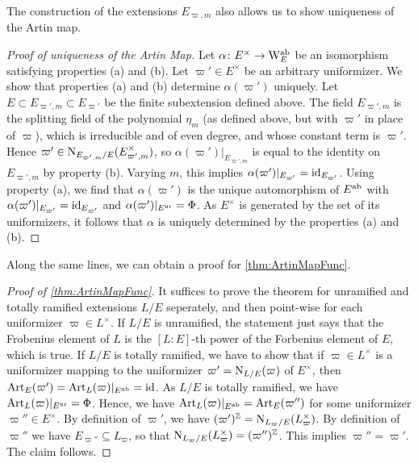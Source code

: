 \documentclass[../main.tex]{subfiles}
\begin{document}
The construction of the extensions $E_{\varpi, m}$ also allows us to show uniqueness 
of the Artin map.

\begin{proof}[Proof of uniqueness of the Artin Map]
  Let $\alpha\colon E^\times \to \mathrm W_E^{\mathrm{ab}}$ be
  an isomorphism satisfying properties (a) and (b). Let ${\varpi'} \in E^\times$
  be an arbitrary
  uniformizer. We show that properties (a) and (b) determine $\alpha({\varpi'})$ uniquely.
  Let $E \subset E_{{\varpi'}, m} \subset E_{\varpi'}$ be the finite subextension 
  defined above. The field $E_{{\varpi'}, m}$ is the splitting field of the polynomial
  $\eta_m$ (as defined above, but with $\varpi'$ in place of $\varpi$), which
  is irreducible and of even degree, and whose
  constant term is ${\varpi'}$. Hence ${\varpi'} \in
  \operatorname{N}_{E_{{\varpi'}, m}/E}(E_{{\varpi'}, m}^\times)$, so $\alpha({\varpi'})|_{E_{{\varpi'}, m}}$ is
  equal to the identity on $E_{{\varpi'}, m}$
  by property (b). Varying $m$, this implies $\alpha({\varpi'})|_{E_{\varpi'}} =
  \operatorname{id}_{E_{\varpi'}}$. Using property (a), we find that $\alpha({\varpi'})$ is the unique
  automorphism of $E^{\mathrm{ab}}$ with $\alpha({\varpi'})|_{E_{\varpi'}} = \operatorname{id}_{E_{\varpi'}}$ and
  $\alpha({\varpi'})|_{E^{\mathrm{nr}}} = \Phi$. As $E^\times$ is generated by the set of its
  uniformizers, it follows that $\alpha$ is uniquely determined by the
  properties (a) and (b).
\end{proof}

Along the same lines, we can obtain a proof for \cref{thm:ArtinMapFunc}. 

\begin{proof}[Proof of \cref{thm:ArtinMapFunc}]
It suffices to prove the theorem for unramified and totally ramified extensions
$L/E$ seperately, and then point-wise for each uniformizer $\varpi \in
L^\times$. If $L/E$ is unramified, the statement just says that the Frobenius
element of $L$ is the $[L:E]$-th power of the Forbenius element of $E$, which
is true. If $L/E$ is totally ramified, we have to show that 
if $\varpi \in L^\times$ is a uniformizer mapping
to the uniformizer $\varpi' = \operatorname{N}_{L/E}(\varpi)$ of $E^\times$, then 
$\operatorname{Art}_E(\varpi') = \operatorname{Art}_L(\varpi)|_{E^{\mathrm{ab}}} = \operatorname{id}$. As $L/E$ is totally ramified, we
have $\operatorname{Art}_L(\varpi)|_{E^{\mathrm{nr}}} = \Phi$. Hence, we have 
$\operatorname{Art}_L(\varpi)|_{E^{\mathrm{ab}}} = \operatorname{Art}_E(\varpi'')$ for some uniformizer $\varpi'' \in
E^\times$. By definition of $\varpi'$, we have $(\varpi')^{\mathbb{Z}} =
\operatorname{N}_{L_{\varpi}/E}(L_\varpi^\times)$. By definition of $\varpi''$ we have
$E_{\varpi''} \subseteq L_{\varpi}$, so that $\operatorname{N}_{L_{\varpi}/E}(L_\varpi^\times) 
= (\varpi'')^{\mathbb{Z}}$. This implies $\varpi'' = \varpi'$. The claim follows.
\end{proof}
\end{document}
